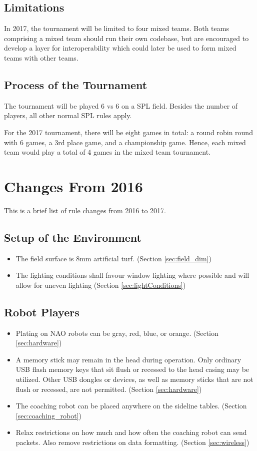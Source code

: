 \documentclass[12pt]{article}
\begin{document}
\subsection{Limitations}
In 2017, the tournament will be limited to four mixed teams. Both teams comprising a mixed team should run their own codebase, but are encouraged to develop a layer for interoperability which could later be used to form mixed teams with other teams. 

\subsection{Process of the Tournament}
The tournament will be played 6 vs 6 on a SPL field. Besides the number of players, all other normal SPL rules apply. 

For the 2017 tournament, there will be eight games in total: a round robin round with 6 games, a 3rd place game, and a championship game.  Hence, each mixed team would play a total of 4 games in the mixed team tournament.

\newpage

\section{Changes From 2016}
This is a brief list of rule changes from 2016 to 2017.

\subsection*{Setup of the Environment}
\begin{itemize}
	\item The field surface is 8mm artificial turf. (Section \ref{sec:field_dim})
	\item The lighting conditions shall favour window lighting where possible and will allow for uneven lighting (Section \ref{sec:lightConditions})
\end{itemize}

\subsection*{Robot Players}
\begin{itemize}
	\item Plating on NAO robots can be gray, red, blue, or orange. (Section \ref{sec:hardware})
	\item A memory stick may remain in the head during operation.  Only ordinary USB flash memory keys that sit flush or recessed to the head casing may be utilized. Other USB dongles or devices, as well as memory sticks that are not flush or recessed, are not permitted. (Section \ref{sec:hardware})
	\item The coaching robot can be placed anywhere on the sideline tables. (Section \ref{sec:coaching_robot})
	\item Relax restrictions on how much and how often the coaching robot can send packets.  Also remove restrictions on data formatting. (Section \ref{sec:wireless})
\end{itemize}
\end{document}
